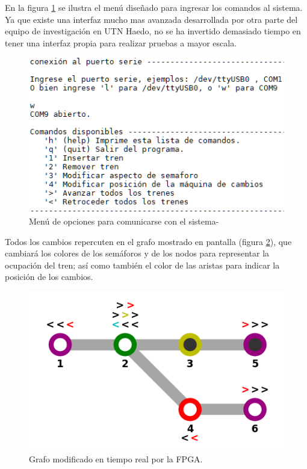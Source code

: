 	En la figura \ref{fig:Menu_UART} se ilustra el menú diseñado para ingresar los comandos al sistema. Ya que existe una interfaz mucho mas avanzada desarrollada por otra parte del equipo de investigación en UTN Haedo, no se ha invertido demasiado tiempo en tener una interfaz propia para realizar pruebas a mayor escala.
	
		\begin{figure}[h]
		\centering
		\includegraphics[scale=.76]{./Figures/Test/UART_2}
			\caption{Menú de opciones para comunicarse con el sistema-}
			\label{fig:Menu_UART}
		\end{figure}
	
	\vspace{5cm}
	
	Todos los cambios repercuten en el grafo mostrado en pantalla (figura \ref{fig:Grafo_UART}), que cambiará los colores de los semáforos y de los nodos para representar la ocupación del tren; así como también el color de las aristas para indicar la posición de los cambios.
	
		\begin{figure}[h]
		\centering
		\includegraphics[scale=.76]{./Figures/Mapa_interfaz}
			\caption{Grafo modificado en tiempo real por la FPGA.}
			\label{fig:Grafo_UART}
		\end{figure}
